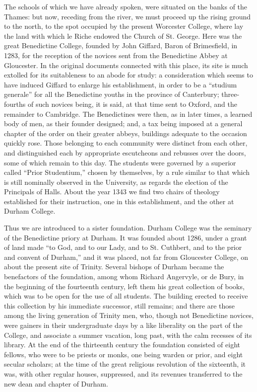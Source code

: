 The schools of which we have
already spoken, were situated on the banks of the Thames: but now,
receding from the river, we must proceed up the rising ground to the
north, to the spot occupied by the present Worcester College, where
lay the land with which le Riche endowed the Church of St. George.
Here was the great Benedictine College, founded by John Giffard, Baron
of Brimesfield, in 1283, for the reception of the novices sent from
the Benedictine Abbey at Gloucester. In the original documents
connected with this place, its site is much extolled for its
suitableness to an abode for study: a consideration which seems to
have induced Giffard to enlarge his establishment, in order to be a ``studium
generale'' for all the Benedictine youths in the province of
Canterbury; three-fourths of such novices being, it is said, at that
time sent to Oxford, and the remainder to Cambridge. The Benedictines
were then, as in later times, a learned body of men, as their founder
designed; and, a tax being imposed at a general chapter of the order
on their greater abbeys, buildings adequate to the occasion quickly
rose. Those belonging to each community were distinct from each other,
and distinguished each by appropriate escutcheons and rebusses over
the doors, some of which remain to this day. The students were
governed by a superior called ``Prior Studentium,'' chosen by
themselves, by a rule similar to that which is still nominally
observed in the University, as regards the election of the Principals
of Halls. About the year 1343 we find two chairs of theology
established for their instruction, one in this establishment, and the
other at Durham College.

Thus we are introduced to a
sister foundation. Durham College was the seminary of the Benedictine
priory at Durham. It was founded about 1286, under a grant of land
made ``to God, and to our Lady, and to St. Cuthbert, and to the prior
and convent of Durham,'' and it was placed, not far from Gloucester
College, on about the present site of Trinity. Several bishops of
Durham became the benefactors of the foundation, among whom Richard
Angervyle, or de Bury, in the beginning of the fourteenth century,
left them his great collection of books, which was to be open for the
use of all students. The building erected to receive this collection
by his immediate successor, still remains; and there are those among
the living generation of Trinity men, who, though not Benedictine
novices, were gainers in their undergraduate days by a like liberality
on the part of the College, and associate a summer vacation, long
past, with the calm recesses of its library. At the end of the
thirteenth century the foundation consisted of eight fellows, who were
to be priests or monks, one being warden or prior, and eight secular
scholars; at the time of the great religious revolution of the
sixteenth, it was, with other regular houses, suppressed, and its
revenues transferred to the new dean and chapter of Durham.

